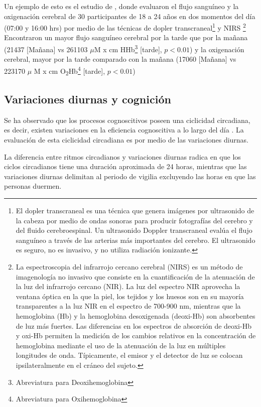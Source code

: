 \documentclass[12pt,letterpaper,final]{article}
\newcommand{\rpm}{\raisebox{.2ex}{$\scriptstyle\pm$}} %
\let\cite\cite %
\begin{document}
Un ejemplo de esto es el estudio de , donde evaluaron el flujo sanguíneo y la oxigenación cerebral de 30 participantes de 18 a 24 años en dos momentos del día (07:00 y 16:00 hrs) por medio de las técnicas de dopler transcraneal\footnote{El dopler transcraneal es una técnica que genera imágenes por ultrasonido de la cabeza por medio de ondas sonoras para producir fotografías del cerebro y del fluido cerebroespinal. Un ultrasonido Doppler transcraneal evalúa el flujo sanguíneo a través de las arterias más importantes del cerebro. El ultrasonido es seguro, no es invasivo, y no utiliza radiación ionizante.} y NIRS \footnote{La  espectroscopia del infrarrojo cercano cerebral (NIRS) es un método de imagenología no invasivo que consiste en la cuantificación de la atenuación de la luz del infrarrojo cercano (NIR). La luz del espectro NIR aprovecha la ventana óptica en la que la piel, los tejidos y los huesos son en su mayoría transparentes a la luz NIR en el espectro de 700-900 nm, mientras que la hemoglobina (Hb) y la hemoglobina desoxigenada (deoxi-Hb) son absorbentes de luz más fuertes. Las diferencias en los espectros de absorción de deoxi-Hb y oxi-Hb permiten la medición de los cambios relativos en la concentración de hemoglobina mediante el uso de la atenuación de la luz en múltiples longitudes de onda. Típicamente, el emisor y el detector de luz se colocan ipsilateralmente en el cráneo del sujeto.} 
Encontraron un mayor flujo sanguíneo cerebral por la tarde que por la mañana (214\rpm 37  [Mañana]  vs 261\rpm 103 $\mu$M x cm HHb\footnote{Abreviatura para Deoxihemoglobina} [tarde],  $ p< 0.01 $) y la oxigenación cerebral, mayor por la tarde comparado con la mañana (170\rpm 60 [Mañana]  vs 223\rpm 170 $\mu$ M x cm O\textsubscript{2}Hb\footnote{Abreviatura para Oxihemoglobina} [tarde], $p < 0.01$)

\subsection{Variaciones diurnas y cognición}
Se ha observado que los procesos cognoscitivos poseen una ciclicidad circadiana, es decir, existen variaciones en la eficiencia cognoscitiva a lo largo del día \cite{Valdez2012}. La evaluación de esta ciclicidad circadiana es por medio de las variaciones diurnas.

La diferencia entre ritmos circadianos y variaciones diurnas radica en que los ciclos circadianos tiene una duración aproximada de 24 horas, mientras que las variaciones diurnas delimitan al periodo de vigilia excluyendo las horas en que las personas duermen.
\end{document}
